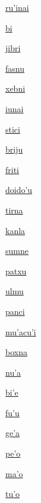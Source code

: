 {\hyperlink{val:ruhinai}{ru'inai}}{}{}{}

{\hyperlink{val:bi}{bi}}{}{}{}

{\hyperlink{val:jibri}{jibri}}{}{}{}

{\hyperlink{val:fasnu}{fasnu}}{}{}{}

{\hyperlink{val:xebni}{xebni}}{}{}{}

{\hyperlink{val:iunai}{iunai}}{}{}{}

{\hyperlink{val:stici}{stici}}{}{}{}

{\hyperlink{val:briju}{briju}}{}{}{}

{\hyperlink{val:friti}{friti}}{}{}{}

{\hyperlink{val:doidohu}{doido'u}}{}{}{}

{\hyperlink{val:tirna}{tirna}}{}{}{}

{\hyperlink{val:kanla}{kanla}}{}{}{}

{\hyperlink{val:sumne}{sumne}}{}{}{}

{\hyperlink{val:patxu}{patxu}}{}{}{}

{\hyperlink{val:ulmu}{ulmu}}{}{}{}

{\hyperlink{val:panci}{panci}}{}{}{}

{\hyperlink{val:muhacuhi}{mu'acu'i}}{}{}{}

{\hyperlink{val:boxna}{boxna}}{}{}{}

{\hyperlink{val:nuha}{nu'a}}{}{}{}

{\hyperlink{val:bihe}{bi'e}}{}{}{}

{\hyperlink{val:fuhu}{fu'u}}{}{}{}

{\hyperlink{val:geha}{ge'a}}{}{}{}

{\hyperlink{val:peho}{pe'o}}{}{}{}

{\hyperlink{val:maho}{ma'o}}{}{}{}

{\hyperlink{val:tuho}{tu'o}}{}{}{}

